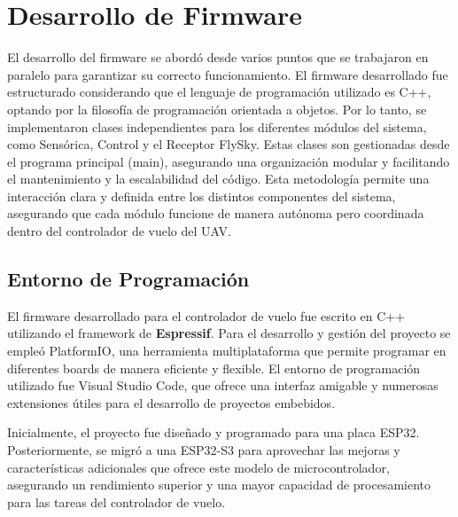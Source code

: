 \section{Desarrollo de Firmware}

    El desarrollo del firmware se abordó desde varios puntos que se trabajaron en paralelo para garantizar su correcto funcionamiento. El firmware desarrollado fue estructurado considerando que el lenguaje de programación utilizado es C++, optando por la filosofía de programación orientada a objetos. Por lo tanto, se implementaron clases independientes para los diferentes módulos del sistema, como Sensórica, Control y el Receptor FlySky. Estas clases son gestionadas desde el programa principal (main), asegurando una organización modular y facilitando el mantenimiento y la escalabilidad del código. Esta metodología permite una interacción clara y definida entre los distintos componentes del sistema, asegurando que cada módulo funcione de manera autónoma pero coordinada dentro del controlador de vuelo del UAV.

    \subsection{Entorno de Programación}
        \vspace{5px}

        El firmware desarrollado para el controlador de vuelo fue escrito en C++ utilizando el framework de \textbf{Espressif}. Para el desarrollo y gestión del proyecto se empleó PlatformIO, una herramienta multiplataforma que permite programar en diferentes boards de manera eficiente y flexible. El entorno de programación utilizado fue Visual Studio Code, que ofrece una interfaz amigable y numerosas extensiones útiles para el desarrollo de proyectos embebidos.\vspace{5px}

        Inicialmente, el proyecto fue diseñado y programado para una placa ESP32. Posteriormente, se migró a una ESP32-S3 para aprovechar las mejoras y características adicionales que ofrece este modelo de microcontrolador, asegurando un rendimiento superior y una mayor capacidad de procesamiento para las tareas del controlador de vuelo.

